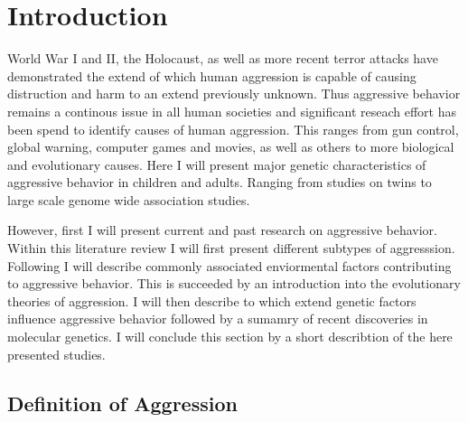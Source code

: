 \chapter{Introduction}
\label{cha:introduction}

World War I and II, the Holocaust, as well as more recent terror attacks have demonstrated the extend of which human aggression is capable of causing distruction and harm to an extend previously unknown. 
Thus aggressive behavior remains a continous issue in all human societies and significant reseach effort has been spend to identify causes of human aggression.
This ranges from gun control, global warning, computer games and movies, as well as others to more biological and evolutionary causes. %
Here I will present major genetic characteristics of aggressive behavior in children and adults.
Ranging from studies on twins to large scale genome wide association studies.

However, first I will present current and past research on aggressive behavior.
Within this literature review I will first present different subtypes of aggresssion.
Following I will describe commonly associated enviormental factors contributing to aggressive behavior.
This is succeeded by an introduction into the evolutionary theories of aggression.
I will then describe to which extend genetic factors influence aggressive behavior followed by a sumamry of recent discoveries in molecular genetics.
I will conclude this section by a short describtion of the here presented studies.

\section{Definition of Aggression}
\label{sec:overview_of_reseach_in_aggression}

